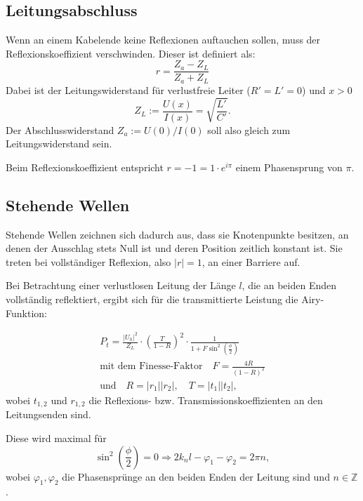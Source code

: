 \documentclass[
	a4paper,
	12pt,
	pagesize,
	ngerman
]{scrartcl}
\begin{document}
	\subsection{Leitungsabschluss}
	Wenn an einem Kabelende keine Reflexionen auftauchen sollen, muss der Reflexionskoeffizient verschwinden.
	Dieser ist definiert als:
	\begin{equation}
		r = \frac{Z_a-Z_L}{Z_a+Z_L}
	\end{equation}
	Dabei ist der  Leitungswiderstand für verlustfreie Leiter ($R'=L'=0$) und $x>0$
	\begin{equation}
		Z_L:=\frac{U(x)}{I(x)}=\sqrt{\frac{L'}{C'}}.
	\end{equation}
	Der Abschlusswiderstand $Z_a:=U(0)/I(0)$ soll also gleich zum Leitungswiderstand sein.

	Beim Reflexionskoeffizient entspricht $r=-1=1 \cdot e^{i\pi}$ einem Phasensprung von $\pi$.

	\subsection{Stehende Wellen}

	Stehende Wellen zeichnen sich dadurch aus, dass sie Knotenpunkte besitzen, an denen der Ausschlag stets Null ist und deren Position zeitlich konstant ist.
	Sie treten bei vollständiger Reflexion, also $| r | = 1	$, an einer Barriere auf.

	Bei Betrachtung einer verlustlosen Leitung der Länge $l$, die an beiden Enden vollständig reflektiert, ergibt sich für die transmittierte Leistung die Airy-Funktion:

	\begin{align}
		P_t = \frac{|U_h|^2}{Z_L} \cdot \left( \frac{T}{1-R} \right) ^2 \cdot \frac{1}{1+F \sin^2 \left( \frac{\phi}{2} \right) } \\
		\text{mit dem Finesse-Faktor} \quad F= \frac{4R}{(1-R)^2} \\
		\text{und} \quad R = |r_1 ||r_2 |, \quad T= |t_1||t_2|,
	\end{align}
	wobei $t_{1,2}$ und $r_{1,2}$ die Reflexions- bzw. Transmissionskoeffizienten an den Leitungsenden sind.

	Diese wird maximal für
	\begin{equation}
		\label{eq_inter}
	\sin ^2 \left( \frac{\phi}{2} \right) = 0 \Rightarrow 2k_nl -\varphi_1 - \varphi_2 = 2\pi n,
	\end{equation}
	wobei $\varphi_1, \varphi_2 $ die Phasensprünge an den beiden Enden der Leitung sind und $n \in \mathbb{Z}$.
\end{document}
